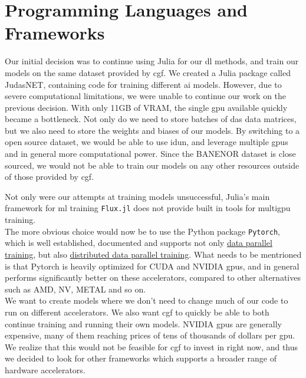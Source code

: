 \section{Programming Languages and Frameworks}

Our initial decision was to continue using Julia for our \acrshort{dl} methods, and train our models on the same dataset provided by \acrshort{cgf}. We created a Julia package called JudasNET, containing code for training different \acrshort{ai} models. However, due to severe computational limitations, we were unable to continue our work on the previous decision. With only 11GB of VRAM, the single \acrshort{gpu} available quickly became a bottleneck. Not only do we need to store batches of \acrshort{das} data matrices, but we also need to store the weights and biases of our models. By switching to a open source dataset, we would be able to use \Gls{idun}, and leverage multiple \acrshort{gpu}s and in general more computational power. Since the BANENOR dataset is close sourced, we would not be able to train our models on any other resources outside of those provided by \acrshort{cgf}.

Not only were our attempts at training models unsuccessful, Julia's main framework for \acrshort{ml} training \texttt{Flux.jl} does not provide built in tools for multigpu training. \\  

The more obvious choice would now be to use the Python package \texttt{Pytorch}, which is well established, documented and supports not only  \href{https://pytorch.org/docs/stable/generated/torch.nn.DataParallel.html}{data parallel training}, but also \href{https://pytorch.org/tutorials/intermediate/ddp_tutorial.html}{distributed data parallel training}. What needs to be mentrioned is that Pytorch is heavily optimized for CUDA and NVIDIA \acrshort{gpu}s, and in general performs significantly better on these accelerators, compared to other alternatives such as AMD, NV, METAL and so on. \\ 

We want to create models where we don't need to change much of our code to run on different accelerators. We also want \acrshort{cgf} to  quickly be able to both continue training and running their own models. NVIDIA \acrshort{gpu}s are generally expensive, many of them reaching prices of tens of thousands of dollars per \acrshort{gpu}. We realize that this would not be feasible for \acrshort{cgf} to invest in right now, and thus we decided to look for other frameworks which supports a broader range of hardware accelerators. \\ 

